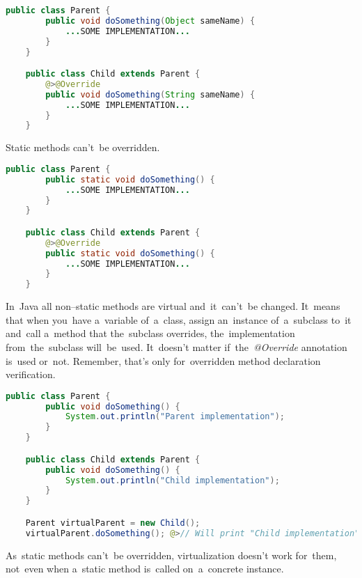 \begin{lstlisting}[language=Java]
    public class Parent {
        public void doSomething(Object sameName) {
            ...SOME IMPLEMENTATION...
        }
    }

    public class Child extends Parent {
        @>@Override
        public void doSomething(String sameName) {
            ...SOME IMPLEMENTATION...
        }
    }
\end{lstlisting}

\warning Static methods can't~be overridden.

\begin{lstlisting}[language=Java]
    public class Parent {
        public static void doSomething() {
            ...SOME IMPLEMENTATION...
        }
    }

    public class Child extends Parent {
        @>@Override
        public static void doSomething() {
            ...SOME IMPLEMENTATION...
        }
    }
\end{lstlisting}

\label{javavirtualmethods}
In~Java all non--static methods are virtual and~it~can't~be changed. It~means that when you~have a~variable of~a~class, assign an~instance of~a~subclass to~it and~call a~method that the~subclass overrides, the~implementation from~the~subclass will~be~used. It~doesn't matter if~the~\textit{@Override} annotation is~used or~not. Remember, that's only for~overridden method declaration verification.

\begin{lstlisting}[language=Java]
    public class Parent {
        public void doSomething() {
            System.out.println("Parent implementation");
        }
    }

    public class Child extends Parent {
        public void doSomething() {
            System.out.println("Child implementation");
        }
    }

    Parent virtualParent = new Child();
    virtualParent.doSomething(); @>// Will print "Child implementation"
\end{lstlisting}

\warning As~static methods can't~be overridden, virtualization doesn't work for~them, not~even when a~static method is~called on~a~concrete instance.

